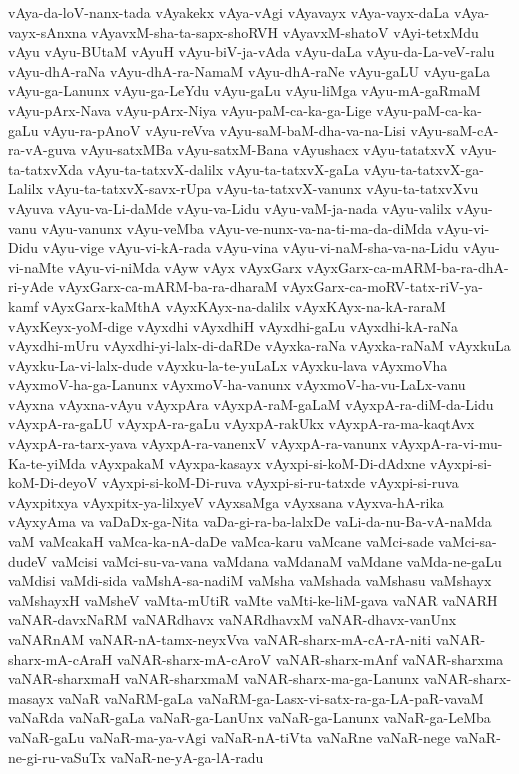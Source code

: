 {vAya-da-loV-nanx-tada
vAyakekx
vAya-vAgi
vAyavayx
vAya-vayx-daLa
vAya-vayx-sAnxna
vAyavxM-sha-ta-sapx-shoRVH
vAyavxM-shatoV
vAyi-tetxMdu
vAyu
vAyu-BUtaM
vAyuH
vAyu-biV-ja-vAda
vAyu-daLa
vAyu-da-La-veV-ralu
vAyu-dhA-raNa
vAyu-dhA-ra-NamaM
vAyu-dhA-raNe
vAyu-gaLU
vAyu-gaLa
vAyu-ga-Lanunx
vAyu-ga-LeYdu
vAyu-gaLu
vAyu-liMga
vAyu-mA-gaRmaM
vAyu-pArx-Nava
vAyu-pArx-Niya
vAyu-paM-ca-ka-ga-Lige
vAyu-paM-ca-ka-gaLu
vAyu-ra-pAnoV
vAyu-reVva
vAyu-saM-baM-dha-va-na-Lisi
vAyu-saM-cA-ra-vA-guva
vAyu-satxMBa
vAyu-satxM-Bana
vAyushacx
vAyu-tatatxvX
vAyu-ta-tatxvXda
vAyu-ta-tatxvX-dalilx
vAyu-ta-tatxvX-gaLa
vAyu-ta-tatxvX-ga-Lalilx
vAyu-ta-tatxvX-savx-rUpa
vAyu-ta-tatxvX-vanunx
vAyu-ta-tatxvXvu
vAyuva
vAyu-va-Li-daMde
vAyu-va-Lidu
vAyu-vaM-ja-nada
vAyu-valilx
vAyu-vanu
vAyu-vanunx
vAyu-veMba
vAyu-ve-nunx-va-na-ti-ma-da-diMda
vAyu-vi-Didu
vAyu-vige
vAyu-vi-kA-rada
vAyu-vina
vAyu-vi-naM-sha-va-na-Lidu
vAyu-vi-naMte
vAyu-vi-niMda
vAyw
vAyx
vAyxGarx
vAyxGarx-ca-mARM-ba-ra-dhA-ri-yAde
vAyxGarx-ca-mARM-ba-ra-dharaM
vAyxGarx-ca-moRV-tatx-riV-ya-kamf
vAyxGarx-kaMthA
vAyxKAyx-na-dalilx
vAyxKAyx-na-kA-raraM
vAyxKeyx-yoM-dige
vAyxdhi
vAyxdhiH
vAyxdhi-gaLu
vAyxdhi-kA-raNa
vAyxdhi-mUru
vAyxdhi-yi-lalx-di-daRDe
vAyxka-raNa
vAyxka-raNaM
vAyxkuLa
vAyxku-La-vi-lalx-dude
vAyxku-la-te-yuLaLx
vAyxku-lava
vAyxmoVha
vAyxmoV-ha-ga-Lanunx
vAyxmoV-ha-vanunx
vAyxmoV-ha-vu-LaLx-vanu
vAyxna
vAyxna-vAyu
vAyxpAra
vAyxpA-raM-gaLaM
vAyxpA-ra-diM-da-Lidu
vAyxpA-ra-gaLU
vAyxpA-ra-gaLu
vAyxpA-rakUkx
vAyxpA-ra-ma-kaqtAvx
vAyxpA-ra-tarx-yava
vAyxpA-ra-vanenxV
vAyxpA-ra-vanunx
vAyxpA-ra-vi-mu-Ka-te-yiMda
vAyxpakaM
vAyxpa-kasayx
vAyxpi-si-koM-Di-dAdxne
vAyxpi-si-koM-Di-deyoV
vAyxpi-si-koM-Di-ruva
vAyxpi-si-ru-tatxde
vAyxpi-si-ruva
vAyxpitxya
vAyxpitx-ya-lilxyeV
vAyxsaMga
vAyxsana
vAyxva-hA-rika
vAyxyAma
va
vaDaDx-ga-Nita
vaDa-gi-ra-ba-lalxDe
vaLi-da-nu-Ba-vA-naMda
vaM
vaMcakaH
vaMca-ka-nA-daDe
vaMca-karu
vaMcane
vaMci-sade
vaMci-sa-dudeV
vaMcisi
vaMci-su-va-vana
vaMdana
vaMdanaM
vaMdane
vaMda-ne-gaLu
vaMdisi
vaMdi-sida
vaMshA-sa-nadiM
vaMsha
vaMshada
vaMshasu
vaMshayx
vaMshayxH
vaMsheV
vaMta-mUtiR
vaMte
vaMti-ke-liM-gava
vaNAR
vaNARH
vaNAR-davxNaRM
vaNARdhavx
vaNARdhavxM
vaNAR-dhavx-vanUnx
vaNARnAM
vaNAR-nA-tamx-neyxVva
vaNAR-sharx-mA-cA-rA-niti
vaNAR-sharx-mA-cAraH
vaNAR-sharx-mA-cAroV
vaNAR-sharx-mAnf
vaNAR-sharxma
vaNAR-sharxmaH
vaNAR-sharxmaM
vaNAR-sharx-ma-ga-Lanunx
vaNAR-sharx-masayx
vaNaR
vaNaRM-gaLa
vaNaRM-ga-Lasx-vi-satx-ra-ga-LA-paR-vavaM
vaNaRda
vaNaR-gaLa
vaNaR-ga-LanUnx
vaNaR-ga-Lanunx
vaNaR-ga-LeMba
vaNaR-gaLu
vaNaR-ma-ya-vAgi
vaNaR-nA-tiVta
vaNaRne
vaNaR-nege
vaNaR-ne-gi-ru-vaSuTx
vaNaR-ne-yA-ga-lA-radu
}
